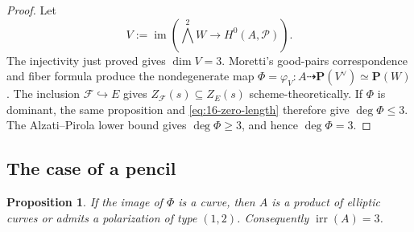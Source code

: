 \documentclass[12pt]{amsart}
\numberwithin{equation}{section}
\newtheorem{proposition}[theorem]{Proposition}
\theoremstyle{definition}
\theoremstyle{remark}
\newcommand{\PP}{\mathbf P}
\newcommand{\irr}{\operatorname{irr}}
\begin{document}
\begin{proof}
Let
\[
 V:=\operatorname{im}\!\left(\bigwedge^2W
       \longrightarrow H^0(A,\mathcal P)\right).
\]
The injectivity just proved gives $\dim V=3$.  Moretti's
good-pairs correspondence and fiber formula
\cite[Proposition~1.5]{Moretti} produce the nondegenerate map
$\Phi=\varphi_V:A\dashrightarrow\PP(V^\vee)\simeq\PP(W)$.
The inclusion $\mathcal F\hookrightarrow E$ gives
$Z_{\mathcal F}(s)\subseteq Z_E(s)$ scheme-theoretically.  If $\Phi$ is
dominant, the same proposition and \eqref{eq:16-zero-length} therefore
give $\deg\Phi\le3$.  The Alzati--Pirola lower bound gives
$\deg\Phi\ge3$, and hence $\deg\Phi=3$.
\end{proof}

\subsection{The case of a pencil}

\begin{proposition}\label{prop:16-exceptional-image}
If the image of $\Phi$ is a curve, then $A$ is a product of elliptic
curves or admits a polarization of type $(1,2)$.  Consequently
$\irr(A)=3$.
\end{proposition}
\end{document}

